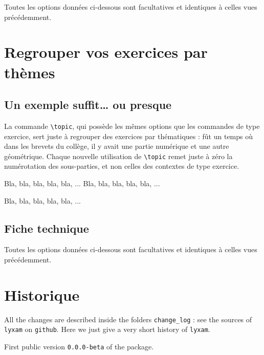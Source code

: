 \documentclass[12pt,a4paper]{article}
\makeatletter
\theoremstyle{definition}
\newcommand\resetallcnt{
		\setcounter{lyxam@counter@topic}{0}
		\setcounter{lyxam@counter@exercise}{0}
		\setcounter{lyxam@counter@problem}{0}
		\setcounter{lyxam@counter@bonus}{0}
		\setcounter{lyxam@counter@subpart}{0}
	}
\newcommand\IDmacro{\@ifstar{\@IDmacroStar}{\@IDmacroNoStar}}
\newcommand\@IDmacroNoStar[3]{%
        \texttt{%
        	\textbackslash#1%
        	\IfStrEq{#2}{0}{}{%
        		\,\,[#2 Option%
				\IfStrEq{#2}{1}{}{s}]%
			}%
    	    \IfStrEq{#3}{}{}{%
	    		\,\,(#3 Argument%
				\IfStrEq{#3}{1}{}{s})%
			}
	   	}
        \immediate\write\tempfile{macro@#1@#2@#3}%
    }
\newcommand\@IDmacroStar[2]{%
        \@IDmacroNoStar{#1}{0}{#2}%
    }
\makeatother
\begin{document}
Toutes les options données ci-dessous sont facultatives et identiques à celles vues précédemment.

\bigskip


\IDmacro{subpart}{6}{0}

\exosoptions{}



\section{Regrouper vos exercices par thèmes}

    \subsection{Un exemple suffit\dots{} ou presque}

La commande \verb+\topic+, qui possède les mêmes options que les commandes de type exercice, sert juste à regrouper des exercices par thématiques : fût un temps où dans les brevets du collège, il y avait une partie numérique et une autre géométrique.
Chaque nouvelle utilisation de \verb+\topic+ remet juste à zéro la numérotation des sous-parties, et non celles des contextes de type exercice.

\resetallcnt{}

\resetallcnt{}

\begin{tcblisting}{}
\topic
\exercise
Bla, bla, bla, bla, bla, ...
\exercise
Bla, bla, bla, bla, bla, ...

\topic
\exercise
Bla, bla, bla, bla, bla, ...
\end{tcblisting}


    \subsection{Fiche technique}

Toutes les options données ci-dessous sont facultatives et identiques à celles vues précédemment.

\bigskip


\IDmacro{topic}{6}{0}

\exosoptions{}




\section{Historique}

All the changes are described inside the folders \verb+change_log+ : see the sources of \verb+lyxam+ on \verb+github+. Here we just give a very short history of \verb+lyxam+.

\begin{description}
	\setlength\itemsep{1em}

	\item[2017-11-03] First public version \verb+0.0.0-beta+ of the package.
\end{description}
\end{document}
